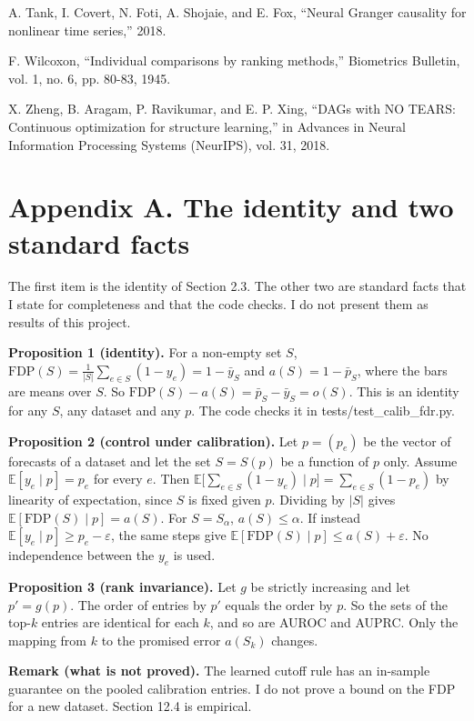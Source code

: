 \documentclass[10pt]{article}
\begin{document}
\hangindent=0.2in\noindent A. Tank, I. Covert, N. Foti, A. Shojaie, and E. Fox, ``Neural Granger causality for nonlinear time series,'' 2018.\par
\hangindent=0.2in\noindent F. Wilcoxon, ``Individual comparisons by ranking methods,'' Biometrics Bulletin, vol. 1, no. 6, pp. 80-83, 1945.\par
\hangindent=0.2in\noindent X. Zheng, B. Aragam, P. Ravikumar, and E. P. Xing, ``DAGs with NO TEARS: Continuous optimization for structure learning,'' in Advances in Neural Information Processing Systems (NeurIPS), vol. 31, 2018.\par
\endgroup
\section*{Appendix A. The identity and two standard facts}
The first item is the identity of Section 2.3. The other two are standard facts that I state for completeness and that the code checks. I do not present them as results of this project.

\textbf{Proposition 1 (identity).} For a non-empty set $S$, $\mathrm{FDP}(S)=\frac{1}{|S|}\sum_{e\in S}(1-y_e)=1-\bar y_S$ and $a(S)=1-\bar p_S$, where the bars are means over $S$. So $\mathrm{FDP}(S)-a(S)=\bar p_S-\bar y_S=o(S)$. This is an identity for any $S$, any dataset and any $p$. The code checks it in tests/test\_calib\_fdr.py.

\textbf{Proposition 2 (control under calibration).} Let $p=(p_e)$ be the vector of forecasts of a dataset and let the set $S=S(p)$ be a function of $p$ only. Assume $\mathbb{E}[y_e\mid p]=p_e$ for every $e$. Then $\mathbb{E}\big[\sum_{e\in S}(1-y_e)\mid p\big]=\sum_{e\in S}(1-p_e)$ by linearity of expectation, since $S$ is fixed given $p$. Dividing by $|S|$ gives $\mathbb{E}[\mathrm{FDP}(S)\mid p]=a(S)$. For $S=S_\alpha$, $a(S)\le\alpha$. If instead $\mathbb{E}[y_e\mid p]\ge p_e-\varepsilon$, the same steps give $\mathbb{E}[\mathrm{FDP}(S)\mid p]\le a(S)+\varepsilon$. No independence between the $y_e$ is used.

\textbf{Proposition 3 (rank invariance).} Let $g$ be strictly increasing and let $p'=g(p)$. The order of entries by $p'$ equals the order by $p$. So the sets of the top-$k$ entries are identical for each $k$, and so are AUROC and AUPRC. Only the mapping from $k$ to the promised error $a(S_k)$ changes.

\textbf{Remark (what is not proved).} The learned cutoff rule has an in-sample guarantee on the pooled calibration entries. I do not prove a bound on the FDP for a new dataset. Section 12.4 is empirical.
\end{document}
